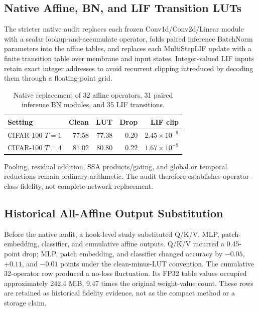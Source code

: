 \subsection{Native Affine, BN, and LIF Transition LUTs}

The stricter native audit replaces each frozen Conv1d/Conv2d/Linear module with
a scalar lookup-and-accumulate operator, folds paired inference BatchNorm
parameters into the affine tables, and replaces each MultiStepLIF update with a
finite transition table over membrane and input states. Integer-valued LIF
inputs retain exact integer addresses to avoid recurrent clipping introduced by
decoding them through a floating-point grid.

\begin{table}[h]
\centering
\footnotesize
\begin{tabular}{lrrrr}
\toprule
Setting & Clean & LUT & Drop & LIF clip \\
\midrule
CIFAR-100 $T=1$ & 77.58 & 77.38 & 0.20 & $2.45{\times}10^{-9}$ \\
CIFAR-100 $T=4$ & 81.02 & 80.80 & 0.22 & $1.67{\times}10^{-9}$ \\
\bottomrule
\end{tabular}
\caption{Native replacement of 32 affine operators, 31 paired inference BN
modules, and 35 LIF transitions.}
\label{tab:supp_native_lut}
\end{table}

Pooling, residual addition, SSA products/gating, and global or temporal
reductions remain ordinary arithmetic. The audit therefore establishes
operator-class fidelity, not complete-network replacement.

\subsection{Historical All-Affine Output Substitution}

Before the native audit, a hook-level study substituted Q/K/V, MLP,
patch-embedding, classifier, and cumulative affine outputs. Q/K/V incurred a
0.45-point drop; MLP, patch embedding, and classifier changed accuracy by
$-0.05$, $+0.11$, and $-0.01$ points under the clean-minus-LUT convention.
The cumulative 32-operator row produced a no-loss fluctuation. Its FP32 table
values occupied approximately 242.4 MiB, 9.47 times the original weight-value
count. These rows are retained as historical fidelity evidence, not as the
compact method or a storage claim.
